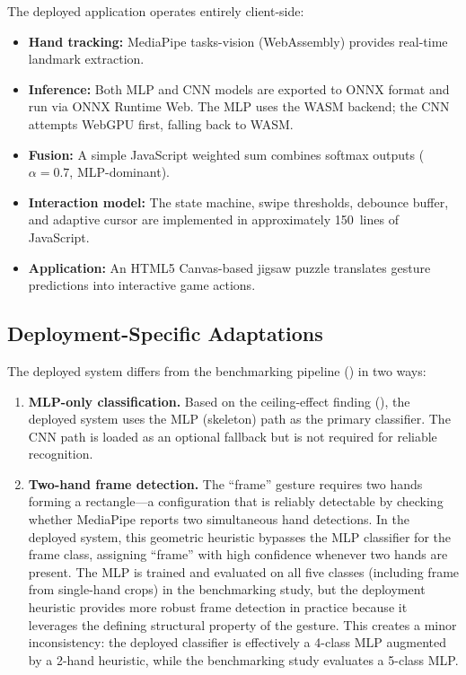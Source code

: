 \documentclass[11pt,a4paper]{article}
\begin{document}
The deployed application operates entirely client-side:
\begin{itemize}
    \item \textbf{Hand tracking:} MediaPipe tasks-vision (WebAssembly) provides real-time landmark extraction.
    \item \textbf{Inference:} Both MLP and CNN models are exported to ONNX format and run via ONNX Runtime Web. The MLP uses the WASM backend; the CNN attempts WebGPU first, falling back to WASM.
    \item \textbf{Fusion:} A simple JavaScript weighted sum combines softmax outputs ($\alpha = 0.7$, MLP-dominant).
    \item \textbf{Interaction model:} The state machine, swipe thresholds, debounce buffer, and adaptive cursor are implemented in approximately 150~lines of JavaScript.
    \item \textbf{Application:} An HTML5 Canvas-based jigsaw puzzle translates gesture predictions into interactive game actions.
\end{itemize}

\subsection{Deployment-Specific Adaptations}
\label{sec:deployment_note}

The deployed system differs from the benchmarking pipeline () in two ways:

\begin{enumerate}
    \item \textbf{MLP-only classification.} Based on the ceiling-effect finding (), the deployed system uses the MLP (skeleton) path as the primary classifier. The CNN path is loaded as an optional fallback but is not required for reliable recognition.
    \item \textbf{Two-hand frame detection.} The ``frame'' gesture requires two hands forming a rectangle---a configuration that is reliably detectable by checking whether MediaPipe reports two simultaneous hand detections. In the deployed system, this geometric heuristic bypasses the MLP classifier for the frame class, assigning ``frame'' with high confidence whenever two hands are present. The MLP is trained and evaluated on all five classes (including frame from single-hand crops) in the benchmarking study, but the deployment heuristic provides more robust frame detection in practice because it leverages the defining structural property of the gesture. This creates a minor inconsistency: the deployed classifier is effectively a 4-class MLP augmented by a 2-hand heuristic, while the benchmarking study evaluates a 5-class MLP.
\end{enumerate}
\end{document}
